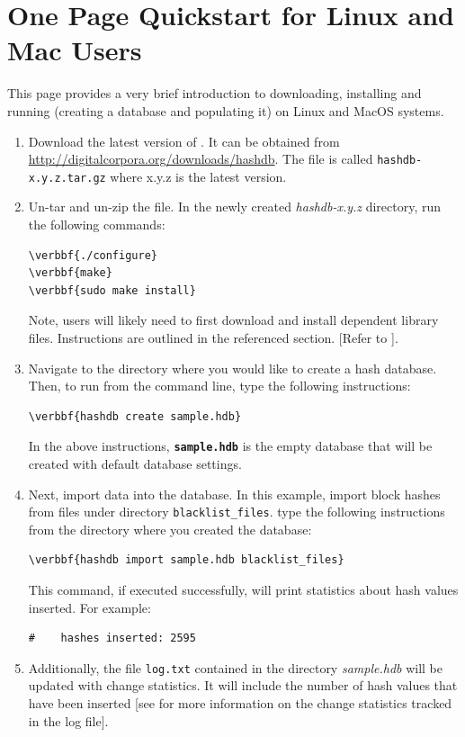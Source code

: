 \documentclass[11pt,fleqn]{article} %
\begin{document}
\section*{One Page Quickstart for Linux and Mac Users}
This page provides a very brief introduction to downloading, installing and running \hdb (creating a database and populating it) on Linux and MacOS systems. 
\begin{enumerate}
\item Download the latest version of \hdb. It can be obtained from \url{http://digitalcorpora.org/downloads/hashdb}. The file is called \texttt{hashdb-x.y.z.tar.gz} where x.y.z is the latest version. 

\item Un-tar and un-zip the file.  In the newly created \textit{hashdb-x.y.z} directory, run the following commands:

\begin{Verbatim}[commandchars=\\\{\}]
\verbbf{./configure}
\verbbf{make}
\verbbf{sudo make install}
\end{Verbatim}
Note, users will likely need to first download and install dependent library files. Instructions are outlined in the referenced section.  [Refer to \textbf{}].

\item Navigate to the directory where you would like to create a hash database. Then, to run \hdb from the command line, type the following instructions: 
\begin{Verbatim}[commandchars=\\\{\}]
\verbbf{hashdb create sample.hdb}
\end{Verbatim} 

In the above instructions, \texttt{\textbf{sample.hdb}} is the empty database that will be created with default database settings. 

\item Next, import data into the database. In this example, import
block hashes from files under directory \texttt{blacklist\_files}.
type the following instructions from the directory where you created the database:
\begin{Verbatim}[commandchars=\\\{\}]
\verbbf{hashdb import sample.hdb blacklist_files}
\end{Verbatim} 
This command, if executed successfully, will print statistics about hash values inserted. For example: 
\begingroup
\footnotesize
\begin{Verbatim}[fontfamily=courier]
#    hashes inserted: 2595
\end{Verbatim}
\endgroup
\item Additionally, the file \texttt{log.txt} contained in the directory \textit{sample.hdb} will be updated with change statistics. It will include the number of hash values that have been inserted [see \textbf{} for more information on the change statistics tracked in the log file].
 
\end{enumerate}
\newpage
\end{document}
